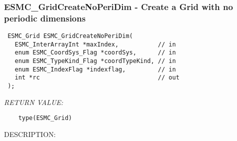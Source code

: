  
\setlength{\oldparskip}{\parskip}
\setlength{\parskip}{1.5ex}
\setlength{\oldparindent}{\parindent}
\setlength{\parindent}{0pt}
\setlength{\oldbaselineskip}{\baselineskip}
\setlength{\baselineskip}{11pt}
 
\def\bv{\begin{verbatim}}
\def\ev{\end{verbatim}}
\def\be{\begin{equation}}
\def\ee{\end{equation}}
\def\bea{\begin{eqnarray}}
\def\eea{\end{eqnarray}}
\def\bi{\begin{itemize}}
\def\ei{\end{itemize}}
\def\bn{\begin{enumerate}}
\def\en{\end{enumerate}}
\def\bd{\begin{description}}
\def\ed{\end{description}}
\def\({\left (}
\def\){\right )}
\def\[{\left [}
\def\]{\right ]}
\def\<{\left  \langle}
\def\>{\right \rangle}
\def\cI{{\cal I}}
\def\diag{\mathop{\rm diag}}
\def\tr{\mathop{\rm tr}}


 
\subsubsection [ESMC\_GridCreateNoPeriDim] {ESMC\_GridCreateNoPeriDim - Create a Grid with no periodic dimensions}


  
\begin{verbatim} ESMC_Grid ESMC_GridCreateNoPeriDim(
   ESMC_InterArrayInt *maxIndex,           // in
   enum ESMC_CoordSys_Flag *coordSys,      // in
   enum ESMC_TypeKind_Flag *coordTypeKind, // in
   enum ESMC_IndexFlag *indexflag,         // in
   int *rc                                 // out
 );\end{verbatim}{\em RETURN VALUE:}
\begin{verbatim}    type(ESMC_Grid)\end{verbatim}
{\sf DESCRIPTION:\\ }


